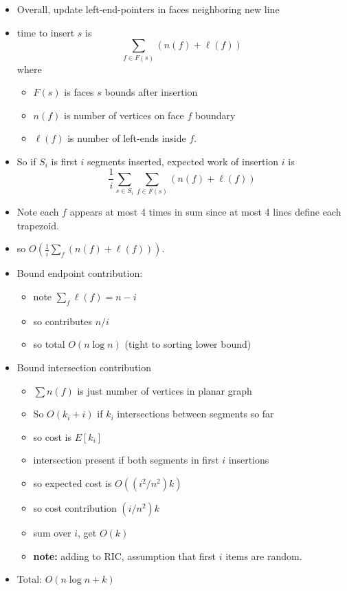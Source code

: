 \documentclass{article}
\begin{document}
\begin{itemize}
\item Overall, update left-end-pointers in faces neighboring new line
\item time to insert $s$ is 
  \[
  \sum_{f \in F(s)} (n(f)+\ell(f))
  \]
  where 
  \begin{itemize}
  \item $F(s)$ is faces $s$ bounds after insertion
  \item $n(f)$ is number of vertices on face  $f$ boundary
  \item  $\ell(f)$ is number of left-ends inside $f$.
  \end{itemize}
\item So if $S_i$ is first $i$ segments inserted, expected work of
  insertion $i$ is
  \[
  \frac1i \sum_{s \in S_i}\sum_{f \in F(s)} (n(f)+\ell(f))
  \]
\item Note each $f$ appears at most 4 times in sum since at most 4
  lines define each trapezoid.
\item so $O(\frac1i \sum_f (n(f)+\ell(f)))$.
\item Bound endpoint contribution:
  \begin{itemize}
  \item note $\sum_f \ell(f) = n-i$
  \item so contributes $n/i$
  \item so total $O(n\log n)$ (tight to sorting lower bound)
  \end{itemize}
\item Bound intersection contribution
  \begin{itemize}
  \item $\sum n(f)$ is just number of vertices in planar graph
  \item So $O(k_i+i)$ if $k_i$ intersections between segments so far
  \item so cost is $E[k_i]$
  \item intersection present if both segments in first $i$ insertions
  \item so expected cost is $O((i^2/n^2)k)$
  \item so cost contribution $(i/n^2)k$
  \item sum over $i$, get $O(k)$
  \item \textbf{ note:} adding to RIC, assumption that first $i$ items are random.
  \end{itemize}
\item Total: $O(n\log n+k)$
\end{itemize}
\end{document}

